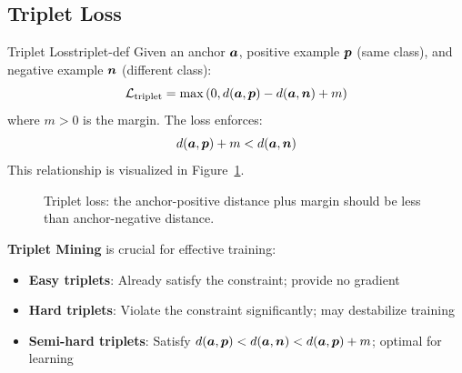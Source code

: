 \documentclass[../../main.tex]{subfiles}
\begin{document}
\subsection{Triplet Loss}

\begin{definition}{Triplet Loss}{triplet-def}
Given an anchor $\boldsymbol{a}$, positive example $\boldsymbol{p}$ (same class), and negative example $\boldsymbol{n}$ (different class):
\[
    \mathcal{L}_{\text{triplet}} = \max\left(0, d(\boldsymbol{a}, \boldsymbol{p}) - d(\boldsymbol{a}, \boldsymbol{n}) + m\right)
\]
where $m > 0$ is the margin. The loss enforces:
\[
    d(\boldsymbol{a}, \boldsymbol{p}) + m < d(\boldsymbol{a}, \boldsymbol{n})
\]
This relationship is visualized in Figure~\ref{fig:triplet-loss}.
\end{definition}

\begin{figure}[htbp]
\centering
{}
\caption{Triplet loss: the anchor-positive distance plus margin should be less than anchor-negative distance.}
\label{fig:triplet-loss}
\end{figure}

\begin{important}
\textbf{Triplet Mining} is crucial for effective training:
\begin{itemize}
    \item \textbf{Easy triplets}: Already satisfy the constraint; provide no gradient
    \item \textbf{Hard triplets}: Violate the constraint significantly; may destabilize training
    \item \textbf{Semi-hard triplets}: Satisfy $d(\boldsymbol{a}, \boldsymbol{p}) < d(\boldsymbol{a}, \boldsymbol{n}) < d(\boldsymbol{a}, \boldsymbol{p}) + m$; optimal for learning
\end{itemize}
\end{important}
\end{document}
